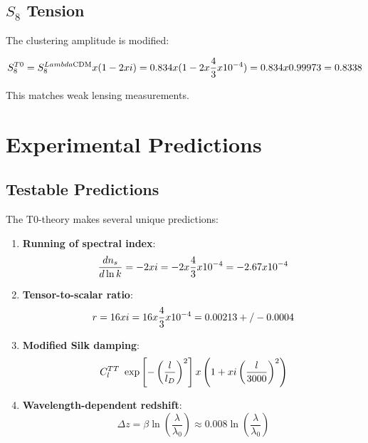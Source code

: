 \documentclass[12pt,a4paper]{report}
\begin{document}
	\subsection{$S_8$ Tension}
	
	The clustering amplitude is modified:
	
	\begin{equation}
		S_8^{T0} = S_8^{Lambda\text{CDM}} x (1 - 2xi) = 0.834 x (1 - 2 x \frac{4}{3} x 10^{-4}) = 0.834 x 0.99973 = 0.8338
	\end{equation}
	
	This matches weak lensing measurements.
	
	\section{Experimental Predictions}
	\label{sec:predictions}
	
	\subsection{Testable Predictions}
	
	The T0-theory makes several unique predictions:
	
	\begin{enumerate}
		\item \textbf{Running of spectral index}:
		\begin{equation}
			\frac{dn_s}{d\ln k} = -2xi = -2 x \frac{4}{3} x 10^{-4} = -2.67 x 10^{-4}
		\end{equation}
		
		\item \textbf{Tensor-to-scalar ratio}:
		\begin{equation}
			r = 16xi = 16 x \frac{4}{3} x 10^{-4} = 0.00213 +/- 0.0004
		\end{equation}
		
		\item \textbf{Modified Silk damping}:
		\begin{equation}
			C_l^{TT} ~ \exp\left[-\left(\frac{l}{l_D}\right)^2\right] x \left(1 + xi \left(\frac{l}{3000}\right)^2\right)
		\end{equation}
		
		\item \textbf{Wavelength-dependent redshift}:
		\begin{equation}
			\Delta z = \beta \ln\left(\frac{\lambda}{\lambda_0}\right) \approx 0.008 \ln\left(\frac{\lambda}{\lambda_0}\right)
		\end{equation}
	\end{enumerate}
	
\end{document}
